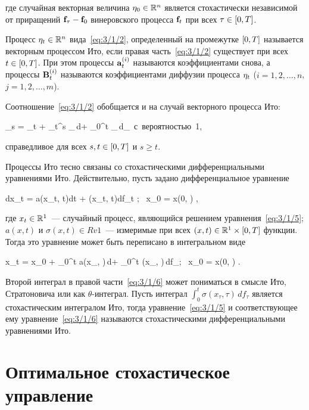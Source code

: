 где случайная векторная величина $\mathbf{\eta}_0 \in \mathbb{R}^{n}$ является стохастически независимой от приращений $\mathbf{f}_\tau - \mathbf{f}_0$ винеровского процесса $\mathbf{f}_t$ при всех $\tau \in [0, T]$.

\begin{df}
	Процесс $\mathbf{\eta}_t \in \mathbb{R}^{n}$ вида~\ref{eq:3/1/2}, определенный на промежутке $[0, T]$ называется векторным процессом Ито, если правая часть~\ref{eq:3/1/2} существует при всех $t \in [0, T]$. При этом процессы $\mathbf{a}_t^{(i)}$ называются коэффициентами снова, а процессы $\mathbf{B}_t^{(i)}$ называются коэффициентами диффузии процесса $\mathbf{\eta}_t$ ($i = 1, 2, \ldots, n$, $j = 1, 2, \ldots, m$).
\end{df}

Соотношение~\ref{eq:3/1/2} обобщается и на случай векторного процесса Ито:

	\eta_s = \eta_t + \int\limits_t^s _\tau\,d\tau + \int\limits_0^t _\tau\,d_\tau \mbox{ с вероятностью 1,}
\eeq

справедливое для всех $s, t \in [0, T]$ и $s \geqslant t$.

\br

Процессы Ито тесно связаны со стохастическими дифференциальными уравнениями Ито. Действительно, пусть задано дифференциальное уравнение

	dx_t = a(x_t, t)dt + \sigma(x_t, t)df_t \mbox{; } x_0 = x(0, \omega) \mbox{,}
\eeq

где $x_t \in \mathbb{R}^{1}$~--- случайный процесс, являющийся решением уравнения~\ref{eq:3/1/5}; $a(x, t)$ и $\sigma(x, t) \in Rv{1}$~--- измеримые при всех $(x, t) \in \mathbb{R}^{1} \times [0, T]$ функции. Тогда это уравнение может быть переписано в интегральном виде

	x_t = x_0 + \int\limits_0^t a(x_\tau, \tau)\,d\tau + \int\limits_0^t \sigma(x_\tau, \tau)\,df_\tau \mbox{; } x_0 = x(0, \omega) \mbox{.}
\eeq

Второй интеграл в правой части~\ref{eq:3/1/6} может пониматься в смысле Ито, Стратоновича или как $\theta$-интеграл\cite{KUZNETCOV}. Пусть интеграл $\int_0^t \sigma(x_\tau, \tau)\,df_\tau$ является стохастическим интегралом Ито, тогда уравнение~\ref{eq:3/1/5} и соответствующее ему уравнение~\ref{eq:3/1/6} называются стохастическими дифференциальными уравнениями Ито.



\section{Оптимальное стохастическое управление}



